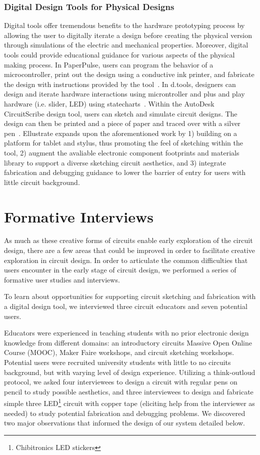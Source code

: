 \documentclass{sigchi}
\begin{document}
\subsubsection{Digital Design Tools for Physical Designs}
Digital tools offer tremendous benefits to the hardware prototyping process by allowing the user to digitally iterate a design before creating the physical version through simulations of the electric and mechanical properties. Moreover, digital tools could provide educational guidance for various aspects of the physical making process. In PaperPulse, users can program the behavior of a microcontroller, print out the design using a conductive ink printer, and fabricate the design with instructions provided by the tool~\cite{RafRamakers:2015gb}. In d.tools, designers can design and iterate hardware interactions using microntroller and plus and play hardware (i.e. slider, LED) using statecharts~\cite{hartmann_reflective_2006}. Within the AutoDesk CircuitScribe design tool, users can sketch and simulate circuit designs. The design can then be printed and a piece of paper and traced over with a silver pen~\cite{_autodesk_????}. Ellustrate expands upon the aforementioned work by 1) building on a platform for tablet and stylus, thus promoting the feel of sketching within the tool, 2) augment the avaliable electronic component footprints and materials library to support a diverse sketching circuit aesthetics, and 3) integrate fabrication and debugging guidance to lower the barrier of entry for users with little circuit background.


\section{Formative Interviews}
As much as these creative forms of circuits enable early exploration of the circuit design, there are a few areas that could be improved in order to facilitate creative exploration in circuit design. In order to articulate the common difficulties that users encounter in the early stage of circuit design, we performed a series of formative user studies and interviews. 

To learn about opportunities for supporting circuit sketching and fabrication with a digital design tool, we interviewed three circuit educators and seven potential users. 

Educators were experienced in teaching students with no prior electronic design knowledge from different domains: an introductory circuits Massive Open Online Course (MOOC), Maker Faire workshops, and circuit sketching workshops. 
Potential users were recruited university students with little to no circuits background, but with varying level of design experience. Utilizing a think-outloud protocol, we asked four interviewees to design a circuit with regular pens on pencil to study possible aesthetics, and three interviewees to design and fabricate simple three LED\footnote{Chibitronics LED stickers} circuit with copper tape (eliciting help from the interviewer as needed) to study potential fabrication and debugging problems. We discovered two major observations that informed the design of our system detailed below.
\end{document}
